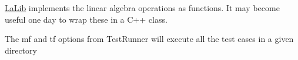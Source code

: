 \begin{DoxyEnumerate}
\item \mbox{\hyperlink{namespaceLaLib}{La\+Lib}} implements the linear algebra operations as functions. It may become useful one day to wrap these in a C++ class.
\item The mf and tf options from Test\+Runner will execute all the test cases in a given directory 
\end{DoxyEnumerate}